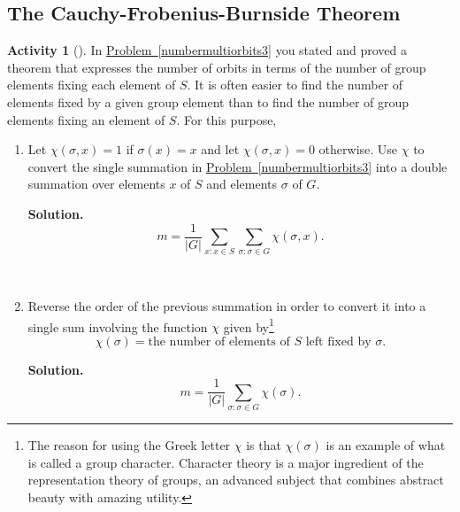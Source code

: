 \documentclass[10pt,]{book}
\theoremstyle{plain}
\theoremstyle{definition}
\newtheorem{activity}[project]{Activity}
\numberwithin{equation}{chapter}
\begin{document}
\subsection[{The Cauchy-Frobenius-Burnside Theorem}]{The Cauchy-Frobenius-Burnside Theorem}\label{subsection-67}
\begin{activity}[]\label{numbermultiorbits4}
In \hyperref[numbermultiorbits3]{Problem~\ref{numbermultiorbits3}} you stated and proved a theorem that expresses the number of orbits in terms of the number of group elements fixing each element of \(S\). It is often easier to find the number of elements fixed by a given group element than to find the number of group elements fixing an element of \(S\). For this purpose,%
~\par
\begin{enumerate}[label=(\alph*)]
 \item Let \(\chi(\sigma,x)=1\) if \(\sigma(x)=x\) and let \(\chi(\sigma,x) =0\) otherwise.  Use \(\chi\) to convert the single summation in \hyperref[numbermultiorbits3]{Problem~\ref{numbermultiorbits3}} into a double summation over elements \(x\) of \(S\) and elements \(\sigma\) of \(G\).%
\par\medskip\noindent%
\textbf{Solution.}\quad %
\begin{equation*}
m=\frac{1}{|G|}\sum_{x:x\in S}\sum_{\sigma:\sigma\in G}
\chi(\sigma,x).
\end{equation*}

~\par
\item Reverse the order of the previous summation in order to convert it into a single sum involving the function \(\chi\) given by\footnote{The reason for using the Greek letter \(\chi\) is that \(\chi(\sigma)\) is an example of what is called a group character.  Character theory is a major ingredient of the representation theory of groups, an advanced subject that combines abstract beauty with amazing utility.\label{fn-23}}%
\begin{equation*}
\chi(\sigma) =
\mbox{the number of elements of \(S\) left fixed by \(\sigma\)} .
\end{equation*}
%
\par\medskip\noindent%
\textbf{Solution.}\quad %
\begin{equation*}
m=\frac{1}{|G|}\sum_{\sigma:\sigma \in G} \chi(\sigma).
\end{equation*}

\end{enumerate}
\end{activity}
\end{document}

